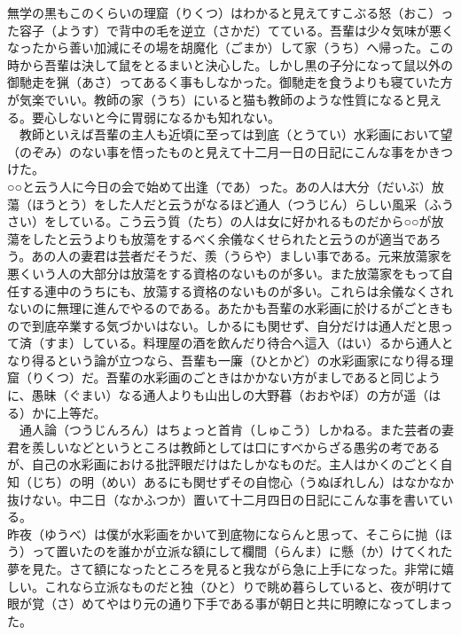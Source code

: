 \documentclass{book}
\begin{document}
無学の黒もこのくらいの理窟（りくつ）はわかると見えてすこぶる怒（おこ）った容子（ようす）で背中の毛を逆立（さかだ）てている。吾輩は少々気味が悪くなったから善い加減にその場を胡魔化（ごまか）して家（うち）へ帰った。この時から吾輩は決して鼠をとるまいと決心した。しかし黒の子分になって鼠以外の御馳走を猟（あさ）ってあるく事もしなかった。御馳走を食うよりも寝ていた方が気楽でいい。教師の家（うち）にいると猫も教師のような性質になると見える。要心しないと今に胃弱になるかも知れない。\\
　教師といえば吾輩の主人も近頃に至っては到底（とうてい）水彩画において望（のぞみ）のない事を悟ったものと見えて十二月一日の日記にこんな事をかきつけた。\\

○○と云う人に今日の会で始めて出逢（であ）った。あの人は大分（だいぶ）放蕩（ほうとう）をした人だと云うがなるほど通人（つうじん）らしい風采（ふうさい）をしている。こう云う質（たち）の人は女に好かれるものだから○○が放蕩をしたと云うよりも放蕩をするべく余儀なくせられたと云うのが適当であろう。あの人の妻君は芸者だそうだ、羨（うらや）ましい事である。元来放蕩家を悪くいう人の大部分は放蕩をする資格のないものが多い。また放蕩家をもって自任する連中のうちにも、放蕩する資格のないものが多い。これらは余儀なくされないのに無理に進んでやるのである。あたかも吾輩の水彩画に於けるがごときもので到底卒業する気づかいはない。しかるにも関せず、自分だけは通人だと思って済（すま）している。料理屋の酒を飲んだり待合へ這入（はい）るから通人となり得るという論が立つなら、吾輩も一廉（ひとかど）の水彩画家になり得る理窟（りくつ）だ。吾輩の水彩画のごときはかかない方がましであると同じように、愚昧（ぐまい）なる通人よりも山出しの大野暮（おおやぼ）の方が遥（はる）かに上等だ。\\

　通人論（つうじんろん）はちょっと首肯（しゅこう）しかねる。また芸者の妻君を羨しいなどというところは教師としては口にすべからざる愚劣の考であるが、自己の水彩画における批評眼だけはたしかなものだ。主人はかくのごとく自知（じち）の明（めい）あるにも関せずその自惚心（うぬぼれしん）はなかなか抜けない。中二日（なかふつか）置いて十二月四日の日記にこんな事を書いている。\\

昨夜（ゆうべ）は僕が水彩画をかいて到底物にならんと思って、そこらに抛（ほう）って置いたのを誰かが立派な額にして欄間（らんま）に懸（か）けてくれた夢を見た。さて額になったところを見ると我ながら急に上手になった。非常に嬉しい。これなら立派なものだと独（ひと）りで眺め暮らしていると、夜が明けて眼が覚（さ）めてやはり元の通り下手である事が朝日と共に明瞭になってしまった。\\
\end{document}
